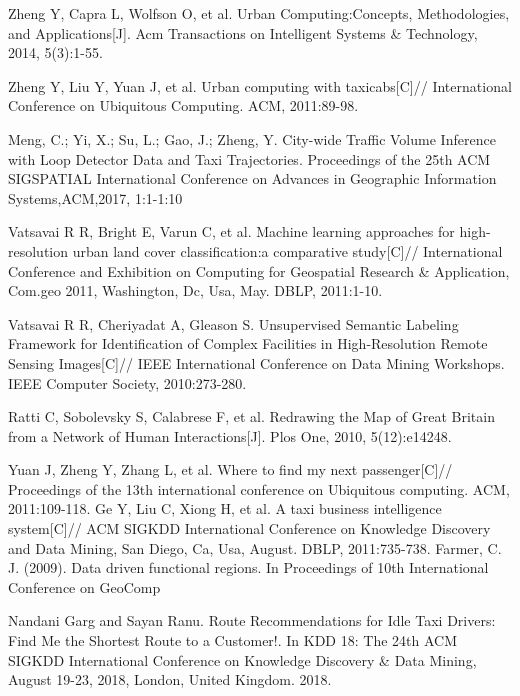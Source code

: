 \documentclass[runningheads]{llncs}
\begin{document}
\begin{thebibliography}{25}
Zheng Y, Capra L, Wolfson O, et al. Urban Computing:Concepts, Methodologies, and Applications[J]. Acm Transactions on Intelligent Systems \& Technology, 2014, 5(3):1-55.
  
Zheng Y, Liu Y, Yuan J, et al. Urban computing with taxicabs[C]// International Conference on Ubiquitous Computing. ACM, 2011:89-98.
   
Meng, C.; Yi, X.; Su, L.; Gao, J.; Zheng, Y. City-wide Traffic Volume Inference with Loop Detector Data and Taxi Trajectories. Proceedings of the 25th ACM SIGSPATIAL International Conference on Advances in Geographic Information Systems,ACM,2017, 1:1-1:10


Vatsavai R R, Bright E, Varun C, et al. Machine learning approaches for high-resolution urban land cover classification:a comparative study[C]// International Conference and Exhibition on Computing for Geospatial Research \& Application, Com.geo 2011, Washington, Dc, Usa, May. DBLP, 2011:1-10.

Vatsavai R R, Cheriyadat A, Gleason S. Unsupervised Semantic Labeling Framework for Identification of Complex Facilities in High-Resolution Remote Sensing Images[C]// IEEE International Conference on Data Mining Workshops. IEEE Computer Society, 2010:273-280.
 

Ratti C, Sobolevsky S, Calabrese F, et al. Redrawing the Map of Great Britain from a Network of Human Interactions[J]. Plos One, 2010, 5(12):e14248.

Yuan J, Zheng Y, Zhang L, et al. Where to find my next passenger[C]// Proceedings of the 13th international conference on Ubiquitous computing. ACM, 2011:109-118.
Ge Y, Liu C, Xiong H, et al. A taxi business intelligence system[C]// ACM SIGKDD International Conference on Knowledge Discovery and Data Mining, San Diego, Ca, Usa, August. DBLP, 2011:735-738.
Farmer, C. J. (2009). Data driven functional regions. In Proceedings of 10th International Conference on GeoComp
 
Nandani Garg and Sayan Ranu. Route Recommendations for Idle Taxi Drivers: Find Me the Shortest Route to a Customer!. In KDD 18: The 24th ACM SIGKDD International Conference on Knowledge Discovery \& Data Mining, August 19-23, 2018, London, United Kingdom. 2018.


\end{thebibliography}
\end{document}
